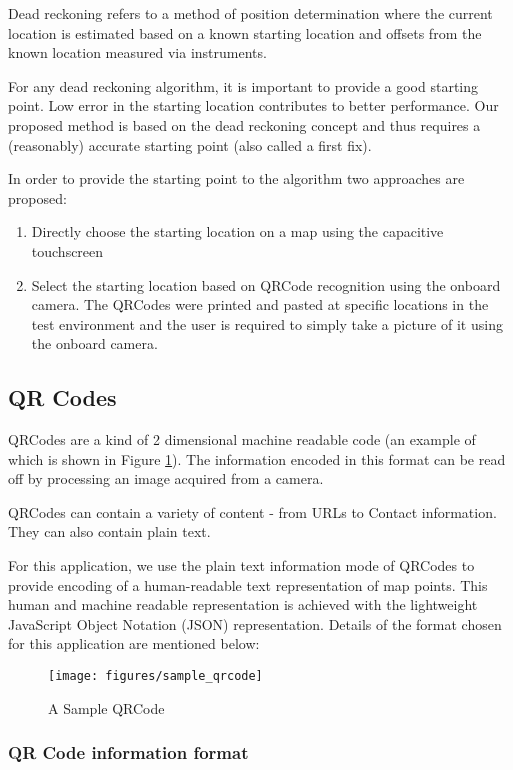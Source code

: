 \documentclass[10pt,journal,letterpaper,compsoc]{IEEEtran}
\begin{document}
Dead reckoning refers to a method of position determination where the current
location is estimated based on a known starting location and offsets from the
known location measured via instruments.

For any dead reckoning algorithm, it is important to provide a good starting
point. Low error in the starting location contributes to better performance.
Our proposed method is based on the dead reckoning concept and thus requires 
a (reasonably) accurate starting point (also called a first fix).

In order to provide the starting point to the algorithm two approaches are 
proposed:

\begin{enumerate}
\item Directly choose the starting location on a map using the capacitive 
    touchscreen
\item Select the starting location based on QRCode recognition using the onboard
    camera. The QRCodes were printed and pasted at specific locations 
    in the test environment and the user is required to simply take a 
    picture of it using the onboard camera.
\end{enumerate}

\subsection{QR Codes\label{sec:QRCodes}}
QRCodes are a kind of 2 dimensional machine readable code (an example of which
is shown in Figure \ref{fig:sample_qrcode}). The information encoded in this
format can be read off by processing an image acquired from a camera. 

QRCodes can contain a variety of content - 
from URLs to Contact information. They can also contain plain text. 

For this application, we use the plain text information mode of QRCodes 
to provide encoding of a human-readable text representation of map points. 
This human and machine readable representation is achieved with the lightweight
JavaScript Object Notation (JSON) representation. 
Details of the format chosen for this application are
mentioned below:

\begin{figure}
    \centering
    \texttt{[image: figures/sample\_qrcode]}
    \caption{A Sample QRCode\label{fig:sample_qrcode}}
\end{figure}


\subsubsection{QR Code information format}
\end{document}
